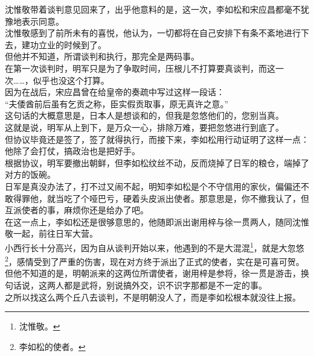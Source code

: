 \begin{multicols}{\theparacolNo}
沈惟敬带着谈判意见回来了，出乎他意料的是，这一次，李如松和宋应昌都毫不犹豫地表示同意。\\

沈惟敬感到了前所未有的喜悦，他认为，一切都将在自己安排下有条不紊地进行下去，建功立业的时候到了。\\

但他并不知道，所谓谈判和执行，那完全是两码事。\\

在第一次谈判时，明军只是为了争取时间，压根儿不打算要真谈判，而这一次……，似乎也没这个打算。\\

因为在战后，宋应昌曾在给皇帝的奏疏中写过这样一段话：\\

“夫倭酋前后虽有乞贡之称，臣实假贡取事，原无真许之意。”\\

这句话的大概意思是，日本人是想谈和的，但我是忽悠他们的，您别当真。\\

这就是说，明军从上到下，是万众一心，排除万难，要把忽悠进行到底了。\\

但协议毕竟还是签了，签了就得执行，而接下来，李如松用行动证明了这样一点：他除了会打仗，搞政治也是把好手。\\

根据协议，明军要撤出朝鲜，但李如松纹丝不动，反而烧掉了日军的粮仓，端掉了对方的饭碗。\\

日军是真没办法了，打不过又闹不起，明知李如松是个不守信用的家伙，偏偏还不敢得罪他，就当吃了个哑巴亏，硬着头皮派出使者。那意思是，你不撤我认了，但互派使者的事，麻烦你还是给办了吧。\\

在这一点上，李如松还是很够意思的，他随即派出谢用梓与徐一贯两人，随同沈惟敬一起，前往日军大营。\\

小西行长十分高兴，因为自从谈判开始以来，他遇到的不是大混混\footnote{沈惟敬。}，就是大忽悠\footnote{李如松的使者。}，感情受到了严重的伤害，现在对方终于派出了正式的使者，实在是可喜可贺。\\

但他不知道的是，明朝派来的这两位所谓使者，谢用梓是参将，徐一贯是游击，换句话说，这两人都是武将，别说搞外交，识不识字那都是不一定的事。\\

之所以找这么两个丘八去谈判，不是明朝没人了，而是李如松根本就没往上报。\\


\end{multicols}
